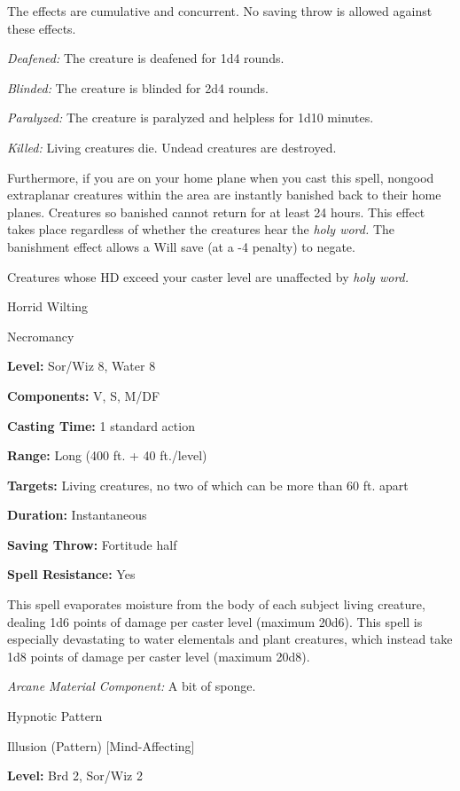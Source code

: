 \documentclass{article}
\begin{document}
The effects are cumulative and concurrent. No saving throw is allowed against these 
effects.

\textit{Deafened: }The creature is deafened for 1d4 rounds.

\textit{Blinded: }The creature is blinded for 2d4 rounds.

\textit{Paralyzed: }The creature is paralyzed and helpless for 1d10 minutes.

\textit{Killed: }Living creatures die. Undead creatures are destroyed.

Furthermore, if you are on your home plane when you cast this spell, nongood extraplanar 
creatures within the area are instantly banished back to their home planes. Creatures 
so banished cannot return for at least 24 hours. This effect takes place regardless 
of whether the creatures hear the \textit{holy word. }The banishment effect allows 
a Will save (at a -4 penalty) to negate.

Creatures whose HD exceed your caster level are unaffected by \textit{holy word.}

\vspace{12pt}
Horrid Wilting

Necromancy

\textbf{Level:} Sor/Wiz 8, Water 8

\textbf{Components:} V, S, M/DF

\textbf{Casting Time:} 1 standard action

\textbf{Range:} Long (400 ft. + 40 ft./level)

\textbf{Targets:} Living creatures, no two of which can be more than 60 ft. apart

\textbf{Duration:} Instantaneous

\textbf{Saving Throw:} Fortitude half

\textbf{Spell Resistance:} Yes

This spell evaporates moisture from the body of each subject living creature, dealing 
1d6 points of damage per caster level (maximum 20d6). This spell is especially 
devastating to water elementals and plant creatures, which instead take 1d8 points 
of damage per caster level (maximum 20d8).

\textit{Arcane Material Component: }A bit of sponge.

\vspace{12pt}
Hypnotic Pattern

Illusion (Pattern) [Mind-Affecting]

\textbf{Level:} Brd 2, Sor/Wiz 2
\end{document}
